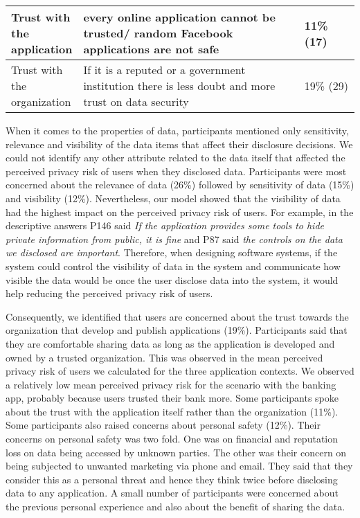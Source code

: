 \documentclass[10pt]{article}
\begin{document}
\begin{center}
\begin{table*}[htbp]
\begin{center}
\begin{adjustbox}{width=1\textwidth}
\begin{tabular}{|p{0.20\linewidth}|p{0.64\linewidth}|p{0.16\linewidth}|}
\hline
Trust with the application & every online application cannot be trusted/ random Facebook applications are not safe & 11\% (17)\\ 
\hline
Trust with the organization & If it is a reputed or a government institution there is less doubt and more trust on data security
 & 19\% (29)\\ 
\hline
\end{tabular}
\end{adjustbox}
\end{center}
\end{table*}
\end{center}

When it comes to the properties of data, participants mentioned only sensitivity, relevance and visibility of the data items that affect their disclosure decisions. We could not identify any other attribute related to the data itself that affected the perceived privacy risk of users when they disclosed data. Participants were most concerned about the relevance of data (26\%) followed by sensitivity of data (15\%) and visibility (12\%). Nevertheless, our model showed that the visibility of data had the highest impact on the perceived privacy risk of users. For example, in the descriptive answers P146 said \textit{If the application provides some tools to hide private information from public, it is fine} and P87 said \textit{the controls on the data we disclosed are
important}. Therefore, when designing software systems, if the system could control the visibility of data in the system and communicate how visible the data would be once the user disclose data into the system, it would help reducing the perceived privacy risk of users. 

Consequently, we identified that users are concerned about the trust towards the organization that develop and publish applications (19\%). Participants said that they are comfortable sharing data as long as the application is developed and owned by a trusted organization. This was observed in the mean perceived privacy risk of users we calculated for the three application contexts. We observed a relatively low mean perceived privacy risk for the scenario with the banking app, probably because users trusted their bank more. Some participants spoke about the trust with the application itself rather than the organization (11\%). Some participants also raised concerns about personal safety (12\%). Their concerns on personal safety was two fold. One was on financial and reputation loss on data being accessed by unknown parties. The other was their concern on being subjected to unwanted marketing via phone and email. They said that they consider this as a personal threat and hence they think twice before disclosing data to any application. A small number of participants were concerned about the previous personal experience and also about the benefit of sharing the data. 
\end{document}
